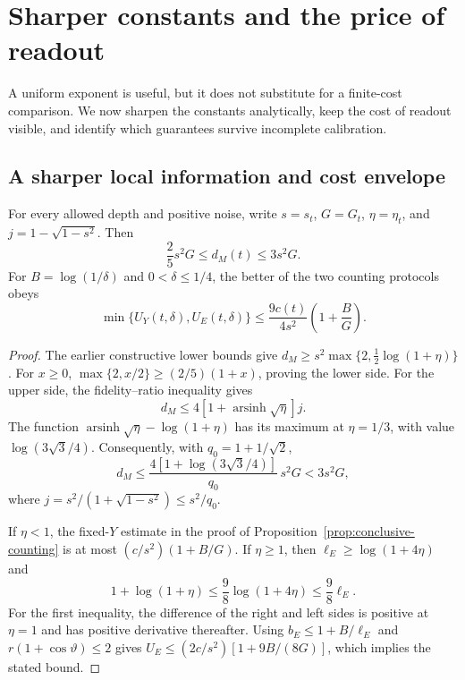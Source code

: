 \section{Sharper constants and the price of readout}
\label{sec:sharp-constants}
A uniform exponent is useful, but it does not substitute for a finite-cost
comparison. We now sharpen the constants analytically, keep the cost of
readout visible, and identify which guarantees survive incomplete calibration.

\subsection{A sharper local information and cost envelope}
\begin{lemma}\label{lem:sharp-local}
For every allowed depth and positive noise, write $s=s_t$, $G=G_t$,
$\eta=\eta_t$, and $j=1-\sqrt{1-s^2}$. Then
\begin{equation}\label{eq:sharp-local}
 \frac25s^2G\leq d_M(t)\leq3s^2G.
\end{equation}
For $B=\log(1/\delta)$ and $0<\delta\leq1/4$, the better of the
two counting protocols obeys
\begin{equation}\label{eq:sharp-local-upper}
 \min\{U_Y(t,\delta),U_E(t,\delta)\}
 \leq\frac{9c(t)}{4s^2}\left(1+\frac B G\right).
\end{equation}
\end{lemma}
\begin{proof}
The earlier constructive lower bounds give
$d_M\geq s^2\max\{2,\tfrac12\log(1+\eta)\}$.
For $x\geq0$, $\max\{2,x/2\}\geq(2/5)(1+x)$, proving the lower side.
For the upper side, the fidelity--ratio inequality gives
\[
 d_M\leq4[1+\operatorname{arsinh}\sqrt\eta]j.
\]
The function $\operatorname{arsinh}\sqrt\eta-\log(1+\eta)$ has its
maximum at $\eta=1/3$, with value $\log(3\sqrt3/4)$.
Consequently, with $q_0=1+1/\sqrt2$,
\[
 d_M\leq
 \frac{4[1+\log(3\sqrt3/4)]}{q_0}\,s^2G<3s^2G,
\]
where $j=s^2/(1+\sqrt{1-s^2})\leq s^2/q_0$.

If $\eta<1$, the fixed-$Y$ estimate in the proof of
Proposition~\ref{prop:conclusive-counting} is at most
$(c/s^2)(1+B/G)$. If $\eta\geq1$, then
$\ell_E\geq\log(1+4\eta)$ and
\[
 1+\log(1+\eta)\leq\frac98\log(1+4\eta)\leq\frac98\ell_E.
\]
For the first inequality, the difference of the right and left sides is
positive at $\eta=1$ and has positive derivative thereafter.
Using $b_E\leq1+B/\ell_E$ and $r(1+\cos\vartheta)\leq2$ gives
$U_E\leq(2c/s^2)[1+9B/(8G)]$, which implies the stated bound.
\end{proof}

